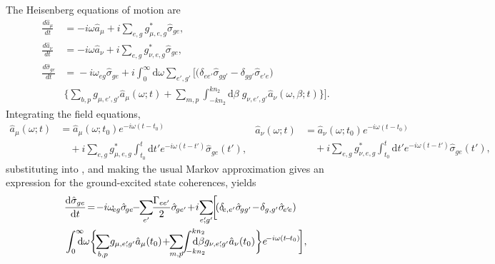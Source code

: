 \documentclass[aps,pra,twocolumn]{revtex4-1} %
\newcommand{\der}[1]{\frac{d {#1}}{dt}}
\begin{document}
The Heisenberg equations of motion are
	\begin{align}
		\der{\hat{a}_\mu} &= -i\omega \hat{a}_\mu +i\sum_{e,g} g_{\mu, e,g}^* \hat{\sigma}_{ge} \label{eq:da},\\
		\der{\hat{a}_\nu} &= -i\omega \hat{a}_\nu +i\sum_{e,g} g_{\nu, e,g}^*  \hat{\sigma}_{ge}\label{eq:danu},\\
		\der{\hat{\sigma}_{ge}} &=\! -i\omega\!_{eg} \hat{\sigma}\!_{ge} 
			\!+\! i\!\!\int_0^{\infty}\!\!\!\!\!\! \mathrm{d}\omega\!\! \sum_{e'\!\!,g'}\!\! \bigg[\! \big(\delta\!_{ee'} \hat{\sigma}\!_{gg'} \!-\! \delta\!_{gg'} \hat{\sigma}\!_{e'\!e} \big) \label{Eq::dsigma}  \\
		&\!\!\!\!\! \bigg\{ \sum_{b,p}  g_{\mu, e',g'}\hat{a}_\mu (\omega; t) \!+\! \sum_{m,p} \!\int_{-kn_2}^{kn_2}\!\!\!\!\!\! \mathrm{d}\beta \; g_{\nu, e',g'} \hat{a}_\nu(\omega, \beta; t) \bigg\} \bigg]. \nonumber
	\end{align}
Integrating the field equations, 
\begin{subequations}\label{eq:aout1}
\begin{align}
\hat{a}_\mu(\omega; t) &= \hat{a}_\mu(\omega; t_0) e^{-i\omega (t-t_0)} \nonumber\\
&\quad +i \sum_{e,g} g_{\mu,e,g}^* \int_{t_0}^t 
\mathrm{d} t' e^{-i\omega (t-t')}\hat{\sigma}_{ge}(t'), \label{Eq::aguidedEOM}
\end{align}
\begin{align}
\hat{a}_\nu (\omega; t) &= \hat{a}_\nu (\omega; t_0) e^{-i\omega (t-t_0)} \nonumber\\
&\quad +i \sum_{e,g} g_{\nu,e,g}^* \int_{t_0}^t \mathrm{d} 
t' e^{-i\omega (t-t')}\hat{\sigma}_{ge}(t'),
\end{align}
\end{subequations}
substituting into , and making the usual Markov approximation gives an expression for the ground-excited state coherences, yields
\begin{align}
&\dt{\hat{\sigma}_{ge}} \!=\!-i\omega\!_{eg} 
\hat{\sigma}\!_{ge}\!\!-\!\!\sum_{e'}\!\!\frac{\Gamma_{ee'}}{2}\hat{\sigma}\!_{ge'}  
\!+\!i\! \sum_{e'\!\!,g'}\!\!\bigg[\! (\delta\!_{e,e'} \hat{\sigma}\!_{gg'} \!-\! \delta_{g,g'} 
\hat{\sigma}\!_{e'\!e})\nn\\
&\int_0^{\infty}\!\!\!\!\!\mathrm{d}\omega \bigg\{\!\!\sum_{b,p} \! g_{\mu, e'\!\!,g'} \hat{a}_\mu (t_0) 
\!+\!\!\sum_{m,p}\!\!  \int_{\!-kn_2}^{kn_2}\!\!\!\!\!\!\!\!\!\mathrm{d}\beta  g_{\nu, e'\!\!,g'} \hat{a}_\nu(t_0) \bigg\} e^{\!-i\omega 
(t\!-\!t_0)} \!\bigg], \nonumber
\end{align}
\end{document}
